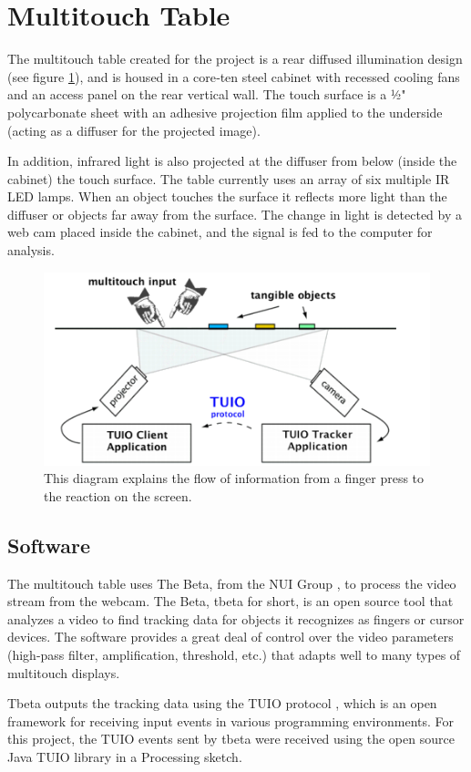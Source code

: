 \section{Multitouch Table}
The multitouch table created for the project is a rear diffused illumination design (see figure \ref{fig:mtdiagram}), and is housed in a core‐ten steel cabinet with recessed cooling fans and an access panel on the rear vertical wall.  The touch surface is a 1⁄2" polycarbonate sheet with an adhesive projection film applied to the underside (acting as a diffuser for the projected image).  

In addition, infrared light is also projected at the diffuser from below (inside the cabinet) the touch surface. The table currently uses an array of six multiple IR LED lamps. When an object touches the surface it reflects more light than the diffuser or objects far away from the surface. The change in light is detected by a web cam placed inside the cabinet, and the signal is fed to the computer for analysis.

\begin{figure}[htp]\centering
  \includegraphics[width=.8\textwidth]{images/mt-diagram.png}
  \caption{This diagram explains the flow of information from a finger press to the reaction on the screen. \cite{REACT}}\label{fig:mtdiagram}
\end{figure}
\subsection{Software}
The multitouch table uses The Beta, from the NUI Group \cite{NUI}, to process the video stream from the webcam. The Beta, tbeta for short, is an open source tool that analyzes a video to find tracking data for objects it recognizes as fingers or cursor devices. The software provides a great deal of control over the video parameters (high-pass filter, amplification, threshold, etc.) that adapts well to many types of multitouch displays.

Tbeta outputs the tracking data using the TUIO protocol \cite{TUIO}, which is an open framework for receiving input events in various programming environments. For this project, the TUIO events sent by tbeta were received using the open source Java TUIO library in a Processing sketch. 
